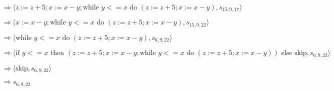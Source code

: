 \documentclass[varwidth=100cm]{standalone}
\begin{document}
$ \Rightarrow \langle z := z + 5; x := x - y; \text{while }y <= x\text{ do }(z := z + 5; x := x - y), s_{15,9,17} \rangle $

$ \Rightarrow \langle x := x - y; \text{while }y <= x\text{ do }(z := z + 5; x := x - y), s_{15,9,22} \rangle $

$ \Rightarrow \langle \text{while }y <= x\text{ do }(z := z + 5; x := x - y), s_{6,9,22} \rangle $

$ \Rightarrow \langle \text{if }y <= x\text{ then }(z := z + 5; x := x - y; \text{while }y <= x\text{ do }(z := z + 5; x := x - y))\text{ else }\text{skip}, s_{6,9,22} \rangle $

$ \Rightarrow \langle \text{skip}, s_{6,9,22} \rangle $

$ \Rightarrow s_{6,9,22} $
\end{document}
